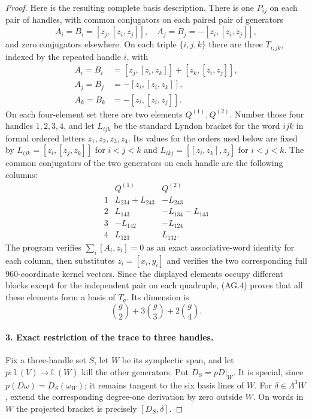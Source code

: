 \begin{proof}
Here is the resulting complete basis description.
There is one $P_{ij}$ on each pair of handles, with
common conjugators on each paired pair of generators
\[
 A_i=B_i=[z_j,[z_i,z_j]],\quad
 A_j=B_j=-[z_i,[z_i,z_j]],
\]
and zero conjugators elsewhere. On each triple
$\{i,j,k\}$ there are three $T_{i;jk}$, indexed
by the repeated handle $i$, with
\[
 \begin{split}
 A_i=B_i&=[z_j,[z_i,z_k]]+[z_k,[z_i,z_j]],\\
 A_j=B_j&=-[z_i,[z_i,z_k]],\\
 A_k=B_k&=-[z_i,[z_i,z_j]].
 \end{split}                                               \tag{AG.5}
\]
On each four-element set there are two elements
$Q^{(1)},Q^{(2)}$. Number those four handles
$1,2,3,4$, and let $L_{ijk}$ be the standard
Lyndon bracket for the word $ijk$ in formal
ordered letters $z_1,z_2,z_3,z_4$. Its values
for the orders used below are fixed by
$L_{ijk}=[z_i,[z_j,z_k]]$ for $i<j<k$ and
$L_{ikj}=[[z_i,z_k],z_j]$ for $i<j<k$.
The common conjugators of the two generators
on each handle are the following columns:
\[
\begin{array}{c|c|c}
 &Q^{(1)}&Q^{(2)}\\\hline
1&L_{234}+L_{243}&-L_{243}\\
2&L_{143}&-L_{134}-L_{143}\\
3&-L_{142}&-L_{124}\\
4&L_{123}&L_{132}.
\end{array}                                               \tag{AG.6}
\]
The program verifies $\sum_i[A_i,z_i]=0$ as an
exact associative-word identity for each column,
then substitutes $z_i=[x_i,y_i]$ and verifies the
two corresponding full $960$-coordinate kernel
vectors. Since the displayed elements occupy
different blocks except for the independent pair
on each quadruple, (AG.4) proves that all these
elements form a basis of $T_g$. Its dimension is
\[
                  {g\choose2}+3{g\choose3}+2{g\choose4}.
                                                               \tag{AG.7}
\]

\paragraph{3. Exact restriction of the trace to three handles.}
Fix a three-handle set $S$, let $W$ be its symplectic
span, and let $p:\mathbb L(V)\to\mathbb L(W)$ kill
the other generators. Put $D_S=pD|_W$.
It is special, since $p(D\omega)=D_S(\omega_W)$;
it remains tangent to the six basis lines of $W$.
For $\delta\in\Lambda^3W$, extend the corresponding
degree-one derivation by zero outside $W$.
On words in $W$ the projected bracket is precisely
$[D_S,\delta]$.


\end{proof}
